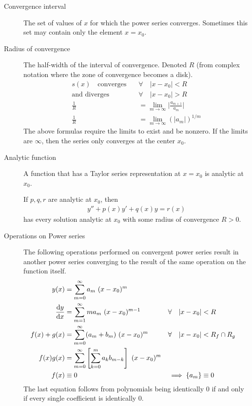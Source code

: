 \begin{description}
    \item[Convergence interval] The set of values of $ x $ for which the power
        series converges. Sometimes this set may contain only the element $ x = x_0 $.
    \item[Radius of convergence] The half-width of the interval of convergence. Denoted
        $ R $ (from complex notation where the zone of convergence becomes a disk).
        \begin{align}
            s(x) \quad \text{converges} \quad & \forall \quad |x - x_0| < R   \\
            \text{and diverges} \quad         & \forall \quad |x - x_0| > R   \\
            \frac{1}{R}                       & = \lim_{m \rightarrow \infty}
            \Big| \frac{a_{m+1}}{a_m}\Big|                                    \\
            \frac{1}{R}                       & = \lim_{m \rightarrow \infty}
            (|a_m|)^{1/m}
        \end{align}
        The above formulas require the limits to exist and be nonzero. If the limits
        are $ \infty $, then the series only converges at the center $ x_0 $.
    \item[Analytic function] A function that has a Taylor series representation at
        $ x = x_0 $ is analytic at $ x_0 $. \par
        If $ p, q, r $ are analytic at $ x_0 $, then
        \begin{align}
            y'' + p(x)y' + q(x)y = r(x) \nonumber
        \end{align}
        has every solution analytic at $ x_0 $ with some radius of convergence
        $ R > 0 $.
    \item[Operations on Power series] The following operations performed on convergent
        power series result in another power series converging to the result of the same
        operation on the function itself.
        \begin{align}
            y(x)                       & = \sum_{m = 0}^{\infty}a_m\ (x - x_0)^{m}       \\
            \diff{y}{x}                & = \sum_{m = 1}^{\infty}m a_m\ (x - x_0)^{m-1} &
            \forall \quad |x - x_0|    & < R                                             \\
            f(x) + g(x)                & = \sum_{m = 0}^{\infty}
            (a_m + b_m)\ (x - x_0)^{m} &
            \forall \quad |x - x_0|    & < R_f \cap R_g                                  \\
            f(x)g(x)                   & = \sum_{m = 0}^{\infty} \left[ \sum_{k=0}^{m}
            a_kb_{m-k} \right]\ (x - x_0)^{m}                                            \\
            f(x)                       & \equiv 0                                      &
            \implies \{a_m\}           & \equiv 0
        \end{align}
        The last equation follows from polynomials being identically $ 0 $ if and
        only if every single coefficient is identically $ 0 $.
\end{description}

